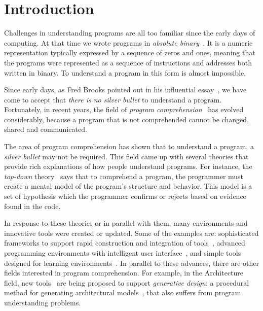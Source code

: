 
\section{Introduction}
\label{sec:introduction}

Challenges in understanding programs are all too familiar since the early days of computing. At that time we wrote programs in \textit{absolute binary}~\cite{hamming2003art}. It is a numeric representation typically expressed by a sequence of zeros and ones, meaning that the programs were represented as a sequence of instructions and addresses both written in binary. To understand a program in this form is almost impossible.

Since early days, as Fred Brooks pointed out in his influential essay~\cite{bullet1987essence}, we have come to accept that \textit{there is no silver bullet} to understand a program. Fortunately, in recent years, the field of \textit{program comprehension}~\cite{rugaber1995program} has evolved considerably, because a program that is not comprehended cannot be changed, shared and communicated.

The area of program comprehension has shown that to understand a program, a \textit{silver bullet} may not be required. This field came up with several theories that provide rich explanations of how people understand programs. For instance, the \textit{top-down} theory~\cite{brooks1977towards} says that to comprehend a program, the programmer must create a mental model of the program's structure and behavior. This model is a set of hypothesis which the programmer confirms or rejects based on evidence found in the code.

In response to these theories or in parallel with them, many environments and innovative tools were created or updated. Some of the examples are: sophisticated frameworks to support rapid construction and integration of tools~\cite{DesRivieres2004}, advanced programming environments with intelligent user interface~\cite{carlson2005eclipse,boudreau2002netbeans,intellij2001intellij,guckenheimer2006software}, and simple tools designed for learning environments~\cite{papert1980mindstorms,Kay1993,Reas2006,findler2002drscheme,GuoSIGCSE2013,mcdirmid2013usable}. In parallel to these advances, there are other fields interested in program comprehension. For example, in the Architecture field, new tools~\cite{aish2012designscript,lopes2011portable} are being proposed to support \textit{generative design}: a procedural method for generating architectural models~\cite{mccormack2004generative}, that also suffers from program understanding problems.

